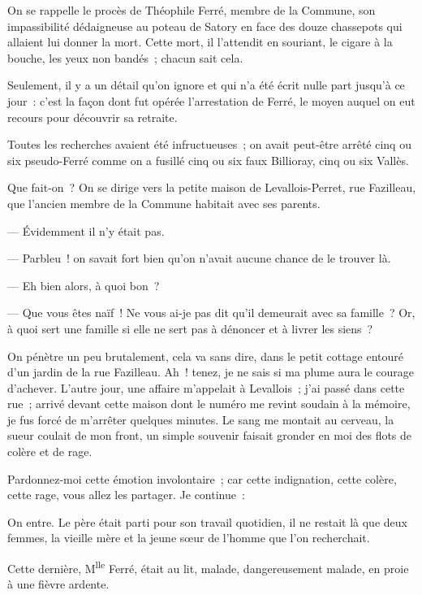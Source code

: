 \documentclass[french,twoside]{book} %
\newenvironment{quoteblock}%
  {\begin{quoting}}
  {\end{quoting}}
\newenvironment{quotebar}{%
    \def\FrameCommand{{\color{rubric!10!}\vrule width 0.5em} \hspace{0.9em}}%
    \def\OuterFrameSep{\itemsep} %
    \MakeFramed {\advance\hsize-\width \FrameRestore}
  }%
  {%
    \endMakeFramed
  }
\renewenvironment{quoteblock}%
  {%
    \savenotes
    \setstretch{0.9}
    \normalfont
    \begin{quotebar}
  }
  {%
    \end{quotebar}
    \spewnotes
  }
\begin{document}
\begin{quoteblock}
 \noindent On se rappelle le procès de Théophile Ferré, membre de la Commune, son impassibilité dédaigneuse au poteau de Satory en face des douze chassepots qui allaient lui donner la mort. Cette mort, il l’attendit en souriant, le cigare à la bouche, les yeux non bandés ; chacun sait cela.\par
 Seulement, il y a un détail qu’on ignore et qui n’a été écrit nulle part jusqu’à ce jour : c’est la façon dont fut opérée l’arrestation de Ferré, le moyen auquel on eut recours pour découvrir sa retraite.\par
 Toutes les recherches avaient été infructueuses ; on avait peut-être arrêté cinq ou six pseudo-Ferré comme on a fusillé cinq ou six faux Billioray, cinq ou six Vallès.\par
 Que fait-on ? On se dirige vers la petite maison de Levallois-Perret, rue Fazilleau, que l’ancien membre de la Commune habitait avec ses parents.\par
   — Évidemment il n’y était pas.\par
 — Parbleu ! on savait fort bien qu’on n’avait aucune chance de le trouver là.\par
 — Eh bien alors, à quoi bon ?\par
 — Que vous êtes naïf ! Ne vous ai-je pas dit qu’il demeurait avec sa famille ? Or, à quoi sert une famille si elle ne sert pas à dénoncer et à livrer les siens ?\par
 On pénètre un peu brutalement, cela va sans dire, dans le petit cottage entouré d’un jardin de la rue Fazilleau. Ah ! tenez, je ne sais si ma plume aura le courage d’achever. L’autre jour, une affaire m’appelait à Levallois ; j’ai passé dans cette rue ; arrivé devant cette maison dont le numéro me revint soudain à la mémoire, je fus forcé de m’arrêter quelques minutes. Le sang me montait au cerveau, la sueur coulait de mon front, un simple souvenir faisait gronder en moi des flots de colère et de rage.\par
 Pardonnez-moi cette émotion involontaire ; car cette indignation, cette colère, cette rage, vous allez les partager. Je continue :\par
 On entre. Le père était parti pour son travail quotidien, il ne restait là que deux femmes, la vieille mère et la jeune sœur de l’homme que l’on recherchait.\par
 Cette dernière, M\textsuperscript{lle} Ferré, était au lit, malade, dangereusement malade, en proie à une fièvre ardente.\par

\end{quoteblock}
\end{document}
